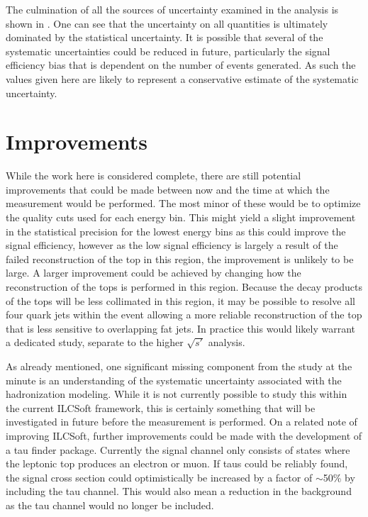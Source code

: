 The culmination of all the sources of uncertainty examined in the analysis is shown in . One can see that the uncertainty on all quantities is ultimately dominated by the statistical uncertainty. It is possible that several of the systematic uncertainties could be reduced in future, particularly the signal efficiency bias that is dependent on the number of events generated. As such the values given here are likely to represent a conservative estimate of the systematic uncertainty.


\section{Improvements}

While the work here is considered complete, there are still potential improvements that could be made between now and the time at which the measurement would be performed. The most minor of these would be to optimize the quality cuts used for each energy bin. This might yield a slight improvement in the statistical precision for the lowest energy bins as this could improve the signal efficiency, however as the low signal efficiency is largely a result of the failed reconstruction of the top in this region, the improvement is unlikely to be large. A larger improvement could be achieved by changing how the reconstruction of the tops is performed in this region. Because the decay products of the tops will be less collimated in this region, it may be possible to resolve all four quark jets within the event allowing a more reliable reconstruction of the top that is less sensitive to overlapping fat jets. In practice this would likely warrant a dedicated study, separate to the higher $\sqrt{s'}$ analysis.

As already mentioned, one significant missing component from the study at the minute is an understanding of the systematic uncertainty associated with the hadronization modeling. While it is not currently possible to study this within the current ILCSoft framework, this is certainly something that will be investigated in future before the measurement is performed. On a related note of improving ILCSoft, further improvements could be made with the development of a tau finder package. Currently the signal channel only consists of states where the leptonic top produces an electron or muon. If taus could be reliably found, the signal cross section could optimistically be increased by a factor of $\sim$50\% by including the tau channel. This would also mean a reduction in the background as the tau channel would no longer be included. 

